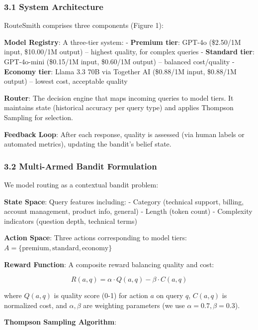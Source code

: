\documentclass[
]{article}
\begin{document}
\hypertarget{system-architecture}{%
\subsubsection{3.1 System Architecture}\label{system-architecture}}

RouteSmith comprises three components (Figure 1):

\textbf{Model Registry}: A three-tier system: - \textbf{Premium tier}:
GPT-4o (\$2.50/1M input, \$10.00/1M output) -- highest quality, for
complex queries - \textbf{Standard tier}: GPT-4o-mini (\$0.15/1M input,
\$0.60/1M output) -- balanced cost/quality - \textbf{Economy tier}:
Llama 3.3 70B via Together AI (\$0.88/1M input, \$0.88/1M output) --
lowest cost, acceptable quality

\textbf{Router}: The decision engine that maps incoming queries to model
tiers. It maintains state (historical accuracy per query type) and
applies Thompson Sampling for selection.

\textbf{Feedback Loop}: After each response, quality is assessed (via
human labels or automated metrics), updating the bandit's belief state.

\hypertarget{multi-armed-bandit-formulation}{%
\subsubsection{3.2 Multi-Armed Bandit
Formulation}\label{multi-armed-bandit-formulation}}

We model routing as a contextual bandit problem:

\textbf{State Space}: Query features including: - Category (technical
support, billing, account management, product info, general) - Length
(token count) - Complexity indicators (question depth, technical terms)

\textbf{Action Space}: Three actions corresponding to model tiers:
\(A = \{\text{premium}, \text{standard}, \text{economy}\}\)

\textbf{Reward Function}: A composite reward balancing quality and cost:

\[R(a, q) = \alpha \cdot Q(a, q) - \beta \cdot C(a, q)\]

where \(Q(a,q)\) is quality score (0-1) for action \(a\) on query \(q\),
\(C(a,q)\) is normalized cost, and \(\alpha, \beta\) are weighting
parameters (we use \(\alpha=0.7, \beta=0.3\)).

\textbf{Thompson Sampling Algorithm}:
\end{document}
